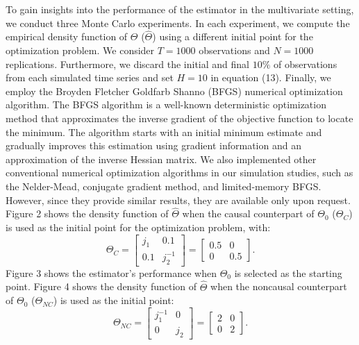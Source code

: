 \documentclass[<1p>]{elsarticle} %
\begin{document}
\indent To gain insights into the performance of the estimator in the multivariate setting, we conduct three Monte Carlo experiments. In each experiment, we compute the empirical density function of $\Theta$ ($\hat{\Theta}$) using a different initial point for the optimization problem. We consider $T=1000$ observations and $N=1000$ replications. Furthermore, we discard the initial and final $10\%$ of observations from each simulated time series and set $H=10$ in equation (13). Finally, we employ the Broyden Fletcher Goldfarb Shanno (BFGS) numerical optimization algorithm. The BFGS algorithm is a well-known deterministic optimization method that approximates the inverse gradient of the objective function to locate the minimum. The algorithm starts with an initial minimum estimate and gradually improves this estimation using gradient information and an approximation of the inverse Hessian matrix. We also implemented other conventional numerical optimization algorithms in our simulation studies, such as the Nelder-Mead, conjugate gradient method, and limited-memory BFGS. However, since they provide similar results, they are available only upon request.\\
\indent Figure 2 shows the density function of $\hat{\Theta}$ when the causal counterpart of $\Theta_{0}$ ($\Theta_{C}$) is used as the initial point for the optimization problem, with:
\begin{equation}
    \Theta_{C}=\begin{bmatrix}
        j_1 & 0.1\\
        0.1 & j_2^{-1} 
    \end{bmatrix}=\begin{bmatrix}
        0.5 & 0\\
        0 & 0.5
    \end{bmatrix}.
\end{equation}
Figure 3 shows the estimator's performance when $\Theta_{0}$ is selected as the starting point. Figure 4 shows the density function of $\hat{\Theta}$ when the noncausal counterpart of $\Theta_{0}$ ($\Theta_{NC}$) is used as the initial point:
\begin{equation}
    \Theta_{NC}=\begin{bmatrix}
        j_1^{-1} & 0\\
        0 & j_2
    \end{bmatrix}=\begin{bmatrix}
        2 & 0\\
        0 & 2
    \end{bmatrix}.
\end{equation}
\end{document}
